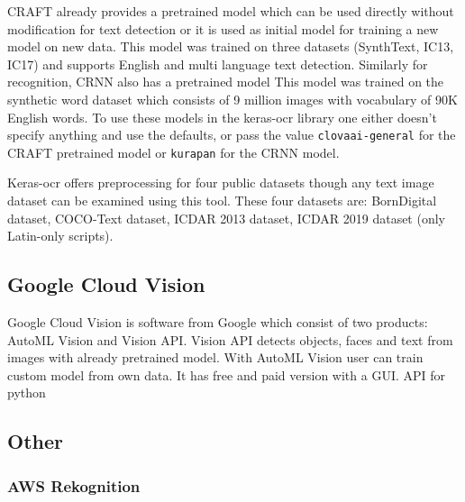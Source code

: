 CRAFT already provides a pretrained model which can be used directly without modification for text detection or it is used as initial model for training a new model on new data. This model was trained on three datasets (SynthText, IC13, IC17) and supports English and multi language text detection. \cite{craft1}
Similarly for recognition, CRNN also has a pretrained model  This model was trained on the synthetic word dataset which consists of 9 million images with vocabulary of 90K English words. \cite{synth}
To use these models in the keras-ocr library one either doesn't specify anything and use the defaults, or pass the value \texttt{clovaai-general} for the CRAFT pretrained model or \texttt{kurapan} for the CRNN model.

Keras-ocr offers preprocessing for four public datasets though any text image dataset can be examined using this tool. These four datasets are: BornDigital dataset, COCO-Text dataset, ICDAR 2013 dataset, ICDAR 2019 dataset (only Latin-only scripts).\cite{keras-ocrDocu}


\subsection{Google Cloud Vision}

Google Cloud Vision is software from Google which consist of two products: AutoML Vision and Vision API. Vision API detects objects, faces and text from images with already pretrained model. With AutoML Vision user can train custom model from own data. It has free and paid version with a GUI.\cite{google1}
API for python

\subsection{Other}

\subsubsection{AWS Rekognition}
